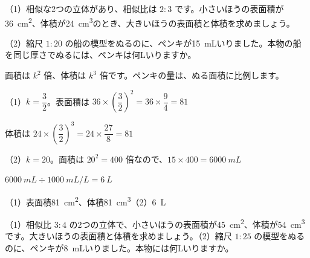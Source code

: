 \begin{reidai}[面積の比と体積の比]
（1）\nobreak 相似な2つの立体があり、相似比は $2:3$ です。小さいほうの表面積が\qty{36}{cm^2}、体積が\qty{24}{cm^3}のとき、大きいほうの表面積と体積を求めましょう。\par
（2）\nobreak 縮尺 $1:20$ の船の模型をぬるのに、ペンキが\qty{15}{mL}いりました。本物の船を同じ厚さでぬるには、ペンキは何Lいりますか。\par
\kangaekata 面積は $k^2$ 倍、体積は $k^3$ 倍です。ペンキの量は、ぬる面積に比例します。\par
\shiki （1）$k=\dfrac{3}{2}$。表面積は $36\times\left(\dfrac{3}{2}\right)^2=36\times\dfrac{9}{4}=81$\par
\hspace*{4.3\zw}体積は $24\times\left(\dfrac{3}{2}\right)^3=24\times\dfrac{27}{8}=81$\par
\hspace*{2.6\zw}（2）$k=20$。面積は $20^2=400$ 倍なので、$15\times400=\qty{6000}{mL}$\par
\hspace*{4.3\zw}$\qty{6000}{mL}\div\qty{1000}{mL/L}=\qty{6}{L}$\par
\kotae （1）\nobreak 表面積\qty{81}{cm^2}、体積\qty{81}{cm^3}\quad（2）\nobreak \qty{6}{L}
\end{reidai}

\begin{jibun}
（1）\nobreak 相似比 $3:4$ の2つの立体で、小さいほうの表面積が\qty{45}{cm^2}、体積が\qty{54}{cm^3}です。大きいほうの表面積と体積を求めましょう。（2）\nobreak 縮尺 $1:25$ の模型をぬるのに、ペンキが\qty{8}{mL}いりました。本物には何Lいりますか。
\end{jibun}

